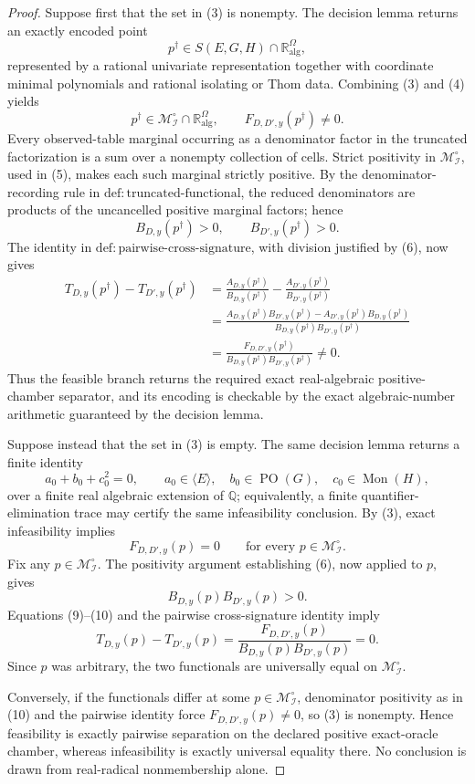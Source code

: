\documentclass{article}
\begin{document}
\begin{proof}
Suppose first that the set in (3) is nonempty.  The decision lemma returns an exactly encoded point
\[
 p^\dagger\in S(E,G,H)\cap\mathbb R_{\mathrm{alg}}^\Omega,
\tag{4}
\]
represented by a rational univariate representation together with coordinate minimal polynomials and rational isolating or Thom data.  Combining (3) and (4) yields
\[
 p^\dagger\in\mathcal M_{\mathcal I}^{\circ}
 \cap\mathbb R_{\mathrm{alg}}^\Omega,
 \qquad
 F_{D,D',y}(p^\dagger)\neq0.
\tag{5}
\]
Every observed-table marginal occurring as a denominator factor in the truncated factorization is a sum over a nonempty collection of cells.  Strict positivity in \(\mathcal M_{\mathcal I}^{\circ}\), used in (5), makes each such marginal strictly positive.  By the denominator-recording rule in \(\mathrm{def{:}truncated\text{-}functional}\), the reduced denominators are products of the uncancelled positive marginal factors; hence
\[
 B_{D,y}(p^\dagger)>0,
 \qquad
 B_{D',y}(p^\dagger)>0.
\tag{6}
\]
The identity in \(\mathrm{def{:}pairwise\text{-}cross\text{-}signature}\), with division justified by (6), now gives
\[
 \begin{aligned}
 T_{D,y}(p^\dagger)-T_{D',y}(p^\dagger)
 &=\frac{A_{D,y}(p^\dagger)}{B_{D,y}(p^\dagger)}
   -\frac{A_{D',y}(p^\dagger)}{B_{D',y}(p^\dagger)}\\
 &=\frac{A_{D,y}(p^\dagger)B_{D',y}(p^\dagger)
          -A_{D',y}(p^\dagger)B_{D,y}(p^\dagger)}
         {B_{D,y}(p^\dagger)B_{D',y}(p^\dagger)}\\
 &=\frac{F_{D,D',y}(p^\dagger)}
         {B_{D,y}(p^\dagger)B_{D',y}(p^\dagger)}\neq0.
 \end{aligned}
\tag{7}
\]
Thus the feasible branch returns the required exact real-algebraic positive-chamber separator, and its encoding is checkable by the exact algebraic-number arithmetic guaranteed by the decision lemma.

Suppose instead that the set in (3) is empty.  The same decision lemma returns a finite identity
\[
 a_0+b_0+c_0^2=0,
 \qquad
 a_0\in\langle E\rangle,
 \quad b_0\in\operatorname{PO}(G),
 \quad c_0\in\operatorname{Mon}(H),
\tag{8}
\]
over a finite real algebraic extension of \(\mathbb Q\); equivalently, a finite quantifier-elimination trace may certify the same infeasibility conclusion.  By (3), exact infeasibility implies
\[
 F_{D,D',y}(p)=0
 \qquad\text{for every }p\in\mathcal M_{\mathcal I}^{\circ}.
\tag{9}
\]
Fix any \(p\in\mathcal M_{\mathcal I}^{\circ}\).  The positivity argument establishing (6), now applied to \(p\), gives
\[
 B_{D,y}(p)B_{D',y}(p)>0.
\tag{10}
\]
Equations (9)--(10) and the pairwise cross-signature identity imply
\[
 T_{D,y}(p)-T_{D',y}(p)
 =\frac{F_{D,D',y}(p)}{B_{D,y}(p)B_{D',y}(p)}=0.
\tag{11}
\]
Since \(p\) was arbitrary, the two functionals are universally equal on \(\mathcal M_{\mathcal I}^{\circ}\).

Conversely, if the functionals differ at some \(p\in\mathcal M_{\mathcal I}^{\circ}\), denominator positivity as in (10) and the pairwise identity force \(F_{D,D',y}(p)\neq0\), so (3) is nonempty.  Hence feasibility is exactly pairwise separation on the declared positive exact-oracle chamber, whereas infeasibility is exactly universal equality there.  No conclusion is drawn from real-radical nonmembership alone.
\end{proof}
\end{document}

